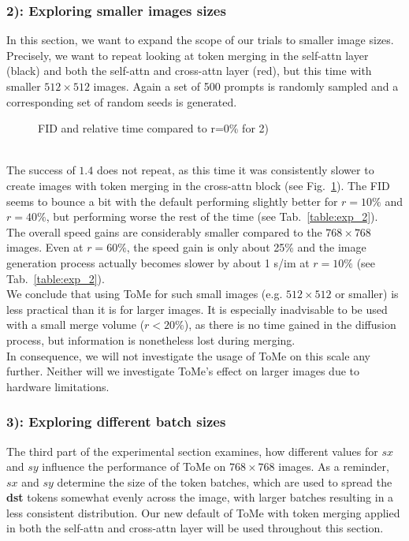 \subsubsection*{2): Exploring smaller images sizes}
In this section, we want to expand the scope of our trials to smaller image sizes. Precisely, we want to repeat looking at token merging in the self-attn layer (black) and both the self-attn and cross-attn layer (red), but this time with smaller $512 \times 512$ images. Again a set of 500 prompts is randomly sampled and a corresponding set of random seeds is generated.
\begin{figure}[!htb]
    
    
\caption{FID and relative time compared to r=0\% for 2)}
\label{fig:exp_2}
\end{figure}\\
The success of \(1.4\) does not repeat, as this time it was consistently slower to create images with token merging in the cross-attn block (see Fig.~\ref{fig:exp_2}). The FID seems to bounce a bit with the default performing slightly better for \(r=10\%\) and \(r=40\%\), but performing worse the rest of the time (see Tab.~\ref{table:exp_2}). \\
The overall speed gains are considerably smaller compared to the \(768 \times 768\) images. Even at \(r=60\%\), the speed gain is only about 25\% and the image generation process actually becomes slower by about 1 s/im at \(r=10\%\) (see Tab.~\ref{table:exp_2}).\\
We conclude that using ToMe for such small images (e.g. $512 \times 512$ or smaller) is less practical than it is for larger images. It is especially inadvisable to be used with a small merge volume (\(r<20\%\)), as there is no time gained in the diffusion process, but information is nonetheless lost during merging. \\
In consequence, we will not investigate the usage of ToMe on this scale any further. Neither will we investigate ToMe's effect on larger images due to hardware limitations.



\subsubsection*{3): Exploring different batch sizes}
The third part of the experimental section examines, how different values for \(sx\) and \(sy\) influence the performance of ToMe on $768 \times 768$ images. As a reminder, \(sx\) and \(sy\) determine the size of the token batches, which are used to spread the \textbf{dst} tokens somewhat evenly across the image, with larger batches resulting in a less consistent distribution. Our new default of ToMe with token merging applied in both the self-attn and cross-attn layer will be used throughout this section.



